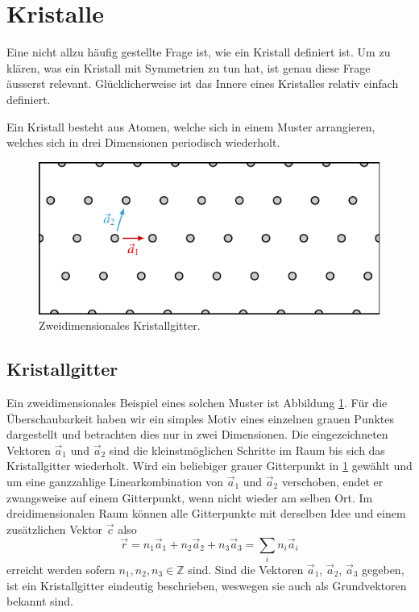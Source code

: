 \section{Kristalle}
Eine nicht allzu häufig gestellte Frage ist, wie ein Kristall definiert ist.
Um zu klären, was ein Kristall mit Symmetrien zu tun hat, ist genau diese Frage äusserst relevant. 
Glücklicherweise ist das Innere eines Kristalles relativ einfach definiert.
\begin{definition}[Kristall]
    Ein Kristall besteht aus Atomen, welche sich in einem Muster arrangieren, welches sich in drei Dimensionen periodisch wiederholt.
\end{definition}

\begin{figure}
    \centering
    \includegraphics[]{papers/punktgruppen/figures/lattice}
    \caption{
        Zweidimensionales Kristallgitter.
        \label{fig:punktgruppen:lattice}
    }
\end{figure}
\subsection{Kristallgitter}
Ein zweidimensionales Beispiel eines solchen Muster ist Abbildung \ref{fig:punktgruppen:lattice}.
Für die Überschaubarkeit haben wir ein simples Motiv eines einzelnen grauen Punktes dargestellt und betrachten dies nur in zwei Dimensionen.
Die eingezeichneten Vektoren \(\vec{a}_1\) und \(\vec{a}_2\) sind die kleinstmöglichen Schritte im Raum bis sich das Kristallgitter wiederholt.
Wird ein beliebiger grauer Gitterpunkt in \ref{fig:punktgruppen:lattice} gewählt und um eine ganzzahlige Linearkombination von \(\vec{a}_1\) und \(\vec{a}_2\) verschoben, endet er zwangsweise auf einem Gitterpunkt, wenn nicht wieder am selben Ort.
Im dreidimensionalen Raum können alle Gitterpunkte mit derselben Idee und einem zusätzlichen Vektor \(\vec{c}\) also
\[
  \vec{r} = n_1 \vec{a}_1 + n_2 \vec{a}_2 + n_3 \vec{a}_3 = \sum_i n_i \vec{a}_i
\]
erreicht werden sofern \(n_1,n_2,n_3 \in \mathbb{Z}\) sind.
Sind die Vektoren  \(\vec{a}_1\), \(\vec{a}_2\), \(\vec{a}_3\) gegeben, ist ein Kristallgitter eindeutig beschrieben, weswegen sie auch als Grundvektoren bekannt sind.

